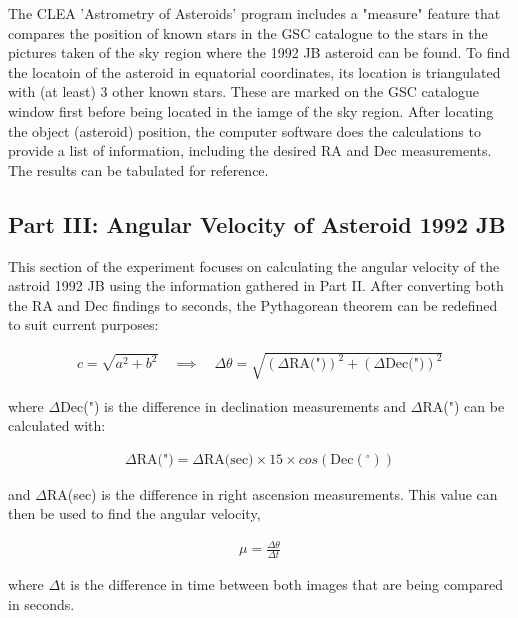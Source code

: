 \documentclass[12pt]{article}
\begin{document}
The CLEA 'Astrometry of Asteroids' program includes a "measure" feature that compares the position of known stars in the GSC catalogue to the stars in the pictures taken of the sky region where the 1992 JB asteroid can be found. To find the locatoin of the asteroid in equatorial coordinates, its
location is triangulated with (at least) 3 other known stars. These are marked on the GSC catalogue window first before being located in the iamge of the sky region. After locating the object (asteroid) position, the computer software does the calculations to provide a list of information, including the desired
RA and Dec measurements. The results can be tabulated for reference.

\subsection{Part III: Angular Velocity of Asteroid 1992 JB}

This section of the experiment focuses on calculating the angular velocity of the astroid 1992 JB using the information gathered in Part II. After converting both the RA and Dec findings to seconds, the Pythagorean theorem can be
redefined to suit current purposes:

\vspace{-2ex}
\begin{gather} \label{eq:1}
    c = \sqrt{a^2 + b^2} \quad \implies \quad \Delta \theta = \sqrt{(\Delta \text{RA(")})^2 + (\Delta \text{Dec(")})^2}
\end{gather}

where $\Delta$Dec(") is the difference in declination measurements and $\Delta$RA(") can be calculated with:

\vspace{-2ex}
\begin{gather} \label{eq:2}
    \Delta \text{RA(")} = \Delta \text{RA(sec)} \times 15 \times cos(\text{Dec}(^{\circ}))
\end{gather}

and $\Delta$RA(sec) is the difference in right ascension measurements. This value can then be used to find the angular velocity,

\vspace{-2ex}
\begin{gather} \label{eq:3}
    \mu = \frac{\Delta \theta}{\Delta t}
\end{gather}

where $\Delta$t is the difference in time between both images that are being compared in seconds.
\end{document}
